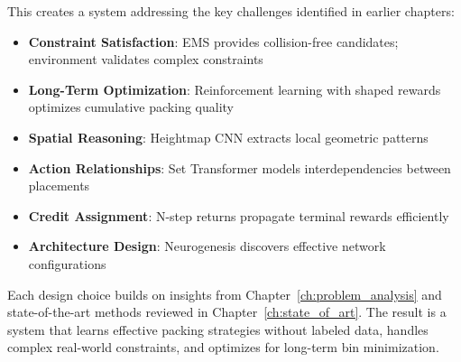 This creates a system addressing the key challenges identified in earlier chapters:

\begin{itemize}
    \item \textbf{Constraint Satisfaction}: EMS provides collision-free candidates; environment validates complex constraints
    \item \textbf{Long-Term Optimization}: Reinforcement learning with shaped rewards optimizes cumulative packing quality
    \item \textbf{Spatial Reasoning}: Heightmap CNN extracts local geometric patterns
    \item \textbf{Action Relationships}: Set Transformer models interdependencies between placements
    \item \textbf{Credit Assignment}: N-step returns propagate terminal rewards efficiently
    \item \textbf{Architecture Design}: Neurogenesis discovers effective network configurations
\end{itemize}

Each design choice builds on insights from Chapter~\ref{ch:problem_analysis} and state-of-the-art methods reviewed in Chapter~\ref{ch:state_of_art}. The result is a system that learns effective packing strategies without labeled data, handles complex real-world constraints, and optimizes for long-term bin minimization.
